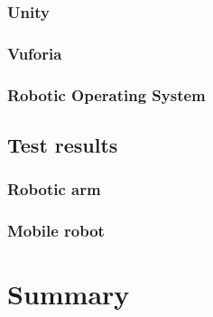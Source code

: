 \documentclass[printmode,en]{mgr}
\begin{document}
\subsection{Unity}

\subsection{Vuforia}

\subsection{Robotic Operating System}

\section{Test results}

\subsection{Robotic arm}

\subsection{Mobile robot}


\chapter{Summary}
\appendix




\end{document}
